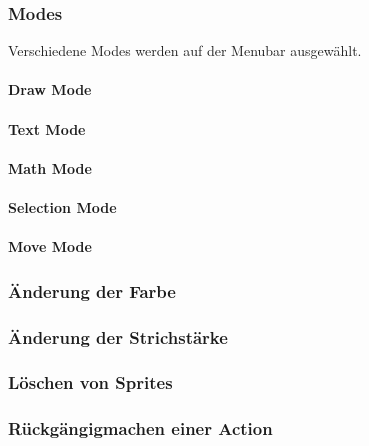 \subsubsection{Modes}

Verschiedene Modes werden auf der Menubar ausgewählt.

\paragraph{Draw Mode}
\paragraph{Text Mode}
\paragraph{Math Mode}
\paragraph{Selection Mode}
\paragraph{Move Mode}

\subsubsection{Änderung der Farbe}
\subsubsection{Änderung der Strichstärke}
\subsubsection{Löschen von Sprites}
\subsubsection{Rückgängigmachen einer Action}
